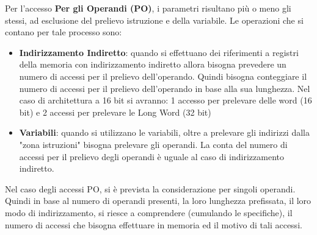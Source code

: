 Per l'accesso \textbf{Per gli Operandi (PO)}, i parametri risultano più o meno gli stessi, ad esclusione del prelievo istruzione e della variabile. Le operazioni che si contano per tale processo sono:
\begin{itemize}
    \item \textbf{Indirizzamento Indiretto}: quando si effettuano dei riferimenti a registri della memoria con indirizzamento indiretto allora bisogna prevedere un numero di accessi per il prelievo dell'operando. Quindi bisogna conteggiare il numero di accessi per il prelievo dell'operando in base alla sua lunghezza. Nel caso di architettura a 16 bit si avranno: 1 accesso per prelevare delle word (16 bit) e 2 accessi per prelevare le Long Word (32 bit)

    \item \textbf{Variabili}: quando si utilizzano le variabili, oltre a prelevare gli indirizzi dalla "zona istruzioni" bisogna prelevare gli operandi. La conta del numero di accessi per il prelievo degli operandi è uguale al caso di indirizzamento indiretto.
\end{itemize}

Nel caso degli accessi PO, si è prevista la considerazione per singoli operandi. Quindi in base al numero di operandi presenti, la loro lunghezza prefissata, il loro modo di indirizzamento, si riesce a comprendere (cumulando le specifiche), il numero di accessi che bisogna effettuare in memoria ed il motivo di tali accessi.
